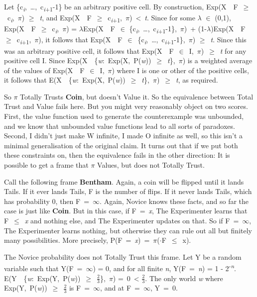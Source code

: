 \documentclass[
  12pt,
  letterpaper,
  DIV=11,
  numbers=noendperiod]{scrartcl}
\begin{document}
Let \{c\textsubscript{\emph{i}},~\ldots,~c\textsubscript{\emph{i}+1}-1\}
be an arbitrary positive cell. By construction,
Exp(X~\textbar~F~$\geq$~c\textsubscript{\emph{i}},~$\pi$) $\geq$~\emph{t}, and
Exp(X~\textbar~F~$\geq$~c\textsubscript{\emph{i}+1},~$\pi$)~\textless~\emph{t}.
Since for some $\lambda$ $\in$ (0,1),
Exp(X~\textbar~F~$\geq$~c\textsubscript{\emph{i}},~$\pi$) = $\lambda$Exp(X~\textbar~F~$\in$
\{c\textsubscript{\emph{i}},~\ldots,~c\textsubscript{\emph{i}+1}-1\},~$\pi$)~+
(1-$\lambda$)Exp(X~\textbar~F~$\geq$~c\textsubscript{\emph{i}+1},~$\pi$), it follows that
Exp(X~\textbar~F~$\in$~\{c\textsubscript{\emph{i}},~\ldots,~c\textsubscript{\emph{i}+1}-1\},~$\pi$)
$\geq$~\emph{t}. Since this was an arbitrary positive cell, it follows that
Exp(X~\textbar~F~$\in$~I,~$\pi$)~$\geq$~\emph{t} for any positive cell I. Since
Exp(X~\textbar~\{\emph{w}:~Exp(X,~P(\emph{w}))~$\geq$~\emph{t}\},~$\pi$) is a
weighted average of the values of Exp(X~\textbar~F~$\in$~I,~$\pi$) where I is
one or other of the positive cells, it follows that
E(X~\textbar~\{\emph{w}:~Exp(X,~P(\emph{w}))~$\geq$~\emph{t}\},~$\pi$)~$\geq$~\emph{t},
as required.

So $\pi$ Totally Trusts \textbf{Coin}, but doesn't Value it. So the
equivalence between Total Trust and Value fails here. But you might very
reasonably object on two scores. First, the value function used to
generate the counterexample was unbounded, and we know that unbounded
value functions lead to all sorts of paradoxes. Second, I didn't just
make W infinite, I made O infinite as well, so this isn't a minimal
generalisation of the original claim. It turns out that if we put both
these constraints on, then the equivalence fails in the other direction:
It is possible to get a frame that $\pi$ Values, but does not Totally Trust.

Call the following frame \textbf{Bentham}. Again, a coin will be flipped
until it lands Tails. If it ever lands Tails, F is the number of flips.
If it never lands Tails, which has probability 0, then F~=~$\infty$. Again,
Novice knows these facts, and so far the case is just like
\textbf{Coin}. But in this case, if F~=~\emph{x}, The Experimenter
learns that F~$\leq$~\emph{x} and nothing else, and The Experimenter updates
on that. So if F~=~$\infty$, The Experimenter learns nothing, but otherwise
they can rule out all but finitely many possibilities. More precisely,
P(F~=~\emph{x})~=~$\pi$($\cdot$\textbar F~$\leq$~x).

The Novice probability does not Totally Trust this frame. Let Y be a
random variable such that Y(F~=~$\infty$) = 0, and for all finite \emph{n},
Y(F~=~\emph{n}) = 1 - 2\textsuperscript{-\emph{n}}.
E(Y~\textbar~\{\emph{w}:~Exp(Y,~P(\emph{w}))~$\geq$~$\frac{2}{3}$\},~$\pi$) =~0~\textless{}
$\frac{2}{3}$. The only world \emph{w} where Exp(Y,~P(\emph{w}))~$\geq$~$\frac{2}{3}$ is F~=~$\infty$, and
at F~=~$\infty$, Y~=~0.
\end{document}
